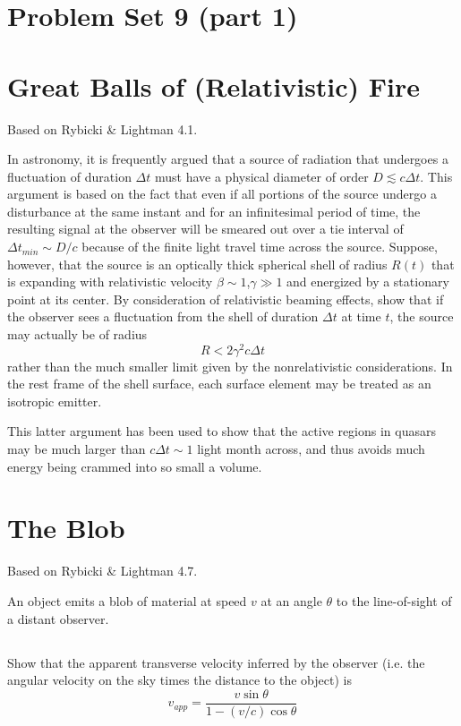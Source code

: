 \documentclass[11pt]{article}
\begin{document}
\pagestyle{empty}

\section*{\centering Problem Set 9 (part 1)}

\section{Great Balls of (Relativistic) Fire}

Based on Rybicki \& Lightman 4.1.

In astronomy, it is frequently argued that a source of radiation that
undergoes a fluctuation of duration $\Delta t$ must have a physical
diameter of order $D\lesssim c\Delta t$.  This argument is based on the 
fact that even if all portions of the source undergo a disturbance at the same instant
and for an infinitesimal period of time, the resulting signal at the
observer will be smeared out over a tie interval of $\Delta t_{min}\sim D/c$
because of the finite light travel time across the source.  Suppose, however,
that the source is an optically thick spherical shell of radius $R(t)$ that
is expanding with relativistic velocity $\beta\sim1$,$\gamma\gg1$ and energized
by a stationary point at its center.  
By consideration of relativistic beaming effects,
show that if the observer sees a fluctuation from the shell of duration $\Delta t$
at time $t$, the source may actually be of radius
\begin{equation}
R<2\gamma^2c\Delta t
\end{equation}
rather than the much smaller limit given by the nonrelativistic considerations.
In the rest frame of the shell surface, each surface element may be treated
as an isotropic emitter.

This latter argument has been used to show that the active regions
in quasars may be much larger than $c\Delta t\sim1$ light month across,
and thus avoids much energy being crammed into so small a volume.

\section{The Blob}

Based on Rybicki \& Lightman 4.7.

An object emits a blob of material at speed $v$ at an angle $\theta$ to
the line-of-sight of a distant observer.

\subsection{}
Show that the apparent transverse velocity inferred by the observer
(i.e. the angular velocity on the sky times the distance to the object) is
\begin{equation}
v_{app}=\frac{v\sin\theta}{1-(v/c)\cos\theta}
\end{equation}
\end{document}
